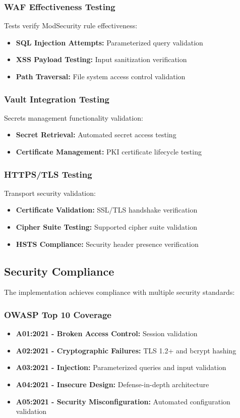 \documentclass[11pt,a4paper]{report}
\begin{document}
\subsubsection{WAF Effectiveness Testing}
Tests verify ModSecurity rule effectiveness:
\begin{itemize}
  \item \textbf{SQL Injection Attempts:} Parameterized query validation
  \item \textbf{XSS Payload Testing:} Input sanitization verification
  \item \textbf{Path Traversal:} File system access control validation
\end{itemize}

\subsubsection{Vault Integration Testing}
Secrets management functionality validation:
\begin{itemize}
  \item \textbf{Secret Retrieval:} Automated secret access testing
  \item \textbf{Certificate Management:} PKI certificate lifecycle testing
\end{itemize}

\subsubsection{HTTPS/TLS Testing}
Transport security validation:
\begin{itemize}
  \item \textbf{Certificate Validation:} SSL/TLS handshake verification
  \item \textbf{Cipher Suite Testing:} Supported cipher suite validation
  \item \textbf{HSTS Compliance:} Security header presence verification
\end{itemize}

\subsection{Security Compliance}

The implementation achieves compliance with multiple security standards:

\subsubsection{OWASP Top 10 Coverage}
\begin{itemize}
  \item \textbf{A01:2021 - Broken Access Control:} Session validation
  \item \textbf{A02:2021 - Cryptographic Failures:} TLS 1.2+ and bcrypt hashing
  \item \textbf{A03:2021 - Injection:} Parameterized queries and input validation
  \item \textbf{A04:2021 - Insecure Design:} Defense-in-depth architecture
  \item \textbf{A05:2021 - Security Misconfiguration:} Automated configuration validation
\end{itemize}
\end{document}

